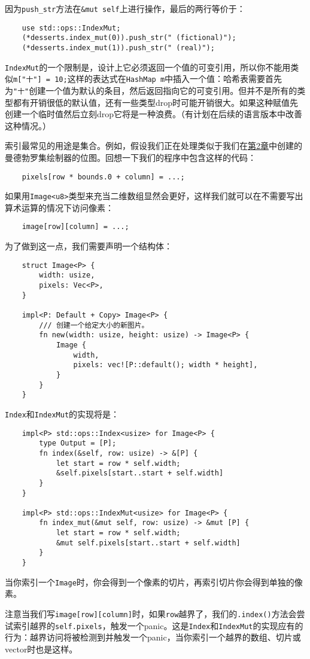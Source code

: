 因为\texttt{push\_str}方法在\texttt{\&mut self}上进行操作，最后的两行等价于：
\begin{verbatim}
    use std::ops::IndexMut;
    (*desserts.index_mut(0)).push_str(" (fictional)");
    (*desserts.index_mut(1)).push_str(" (real)");
\end{verbatim}

\texttt{IndexMut}的一个限制是，设计上它必须返回一个值的可变引用，所以你不能用类似\texttt{m["十"] = 10;}这样的表达式在\texttt{HashMap m}中插入一个值：哈希表需要首先为\texttt{"十"}创建一个值为默认的条目，然后返回指向它的可变引用。但并不是所有的类型都有开销很低的默认值，还有一些类型drop时可能开销很大。如果这种赋值先创建一个临时值然后立刻drop它将是一种浪费。（有计划在后续的语言版本中改善这种情况。）

索引最常见的用途是集合。例如，假设我们正在处理类似于我们在\hyperref[ch02]{第2章}中创建的曼德勃罗集绘制器的位图。回想一下我们的程序中包含这样的代码：
\begin{verbatim}
    pixels[row * bounds.0 + column] = ...;
\end{verbatim}

如果用\texttt{Image<u8>}类型来充当二维数组显然会更好，这样我们就可以在不需要写出算术运算的情况下访问像素：
\begin{verbatim}
    image[row][column] = ...;
\end{verbatim}

为了做到这一点，我们需要声明一个结构体：
\begin{verbatim}
    struct Image<P> {
        width: usize,
        pixels: Vec<P>,
    }

    impl<P: Default + Copy> Image<P> {
        /// 创建一个给定大小的新图片。
        fn new(width: usize, height: usize) -> Image<P> {
            Image {
                width,
                pixels: vec![P::default(); width * height],
            }
        }
    }
\end{verbatim}

\texttt{Index}和\texttt{IndexMut}的实现将是：
\begin{verbatim}
    impl<P> std::ops::Index<usize> for Image<P> {
        type Output = [P];
        fn index(&self, row: usize) -> &[P] {
            let start = row * self.width;
            &self.pixels[start..start + self.width]
        }
    }

    impl<P> std::ops::IndexMut<usize> for Image<P> {
        fn index_mut(&mut self, row: usize) -> &mut [P] {
            let start = row * self.width;
            &mut self.pixels[start..start + self.width]
        }
    }
\end{verbatim}

当你索引一个\texttt{Image}时，你会得到一个像素的切片，再索引切片你会得到单独的像素。

注意当我们写\texttt{image[row][column]}时，如果\texttt{row}越界了，我们的\texttt{.index()}方法会尝试索引越界的\texttt{self.pixels}，触发一个panic。这是\texttt{Index}和\texttt{IndexMut}的实现应有的行为：越界访问将被检测到并触发一个panic，当你索引一个越界的数组、切片或vector时也是这样。

\section{}
